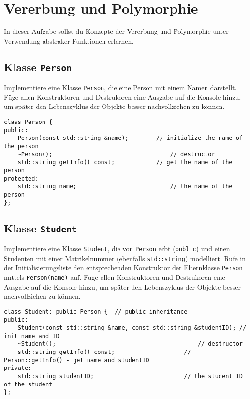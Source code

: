 \section{Vererbung und Polymorphie}\label{sec:inheritance}
In dieser Aufgabe sollst du Konzepte der Vererbung und Polymorphie unter Verwendung abstraker Funktionen erlernen.

\subsection{Klasse \texttt{Person}}
Implementiere eine Klasse \texttt{Person}, die eine Person mit einem Namen darstellt.
Füge allen Konstruktoren und Destrukoren eine Ausgabe auf die Konsole hinzu, um später den Lebenszyklus der Objekte besser nachvollziehen zu können.

\begin{lstlisting}
class Person {
public:
	Person(const std::string &name);		// initialize the name of the person
	~Person();									// destructor
	std::string getInfo() const;			// get the name of the person
protected:
	std::string name;							// the name of the person
};
\end{lstlisting}


\subsection{Klasse \texttt{Student}}
Implementiere eine Klasse \texttt{Student}, die von \texttt{Person} erbt (\texttt{public}) und einen Studenten mit einer Matrikelnummer (ebenfalls \texttt{std::string}) modelliert.
Rufe in der Initialisierungsliste den entsprechenden Konstruktor der Elternklasse \texttt{Person} mittels \texttt{Person(name)} auf.
Füge allen Konstruktoren und Destrukoren eine Ausgabe auf die Konsole hinzu, um später den Lebenszyklus der Objekte besser nachvollziehen zu können.

\begin{lstlisting}
class Student: public Person {	// public inheritance
public:
	Student(const std::string &name, const std::string &studentID); // init name and ID
	~Student();											// destructor
	std::string getInfo() const;					// Person::getInfo() - get name and studentID
private:
	std::string studentID;							// the student ID of the student
};
\end{lstlisting}

